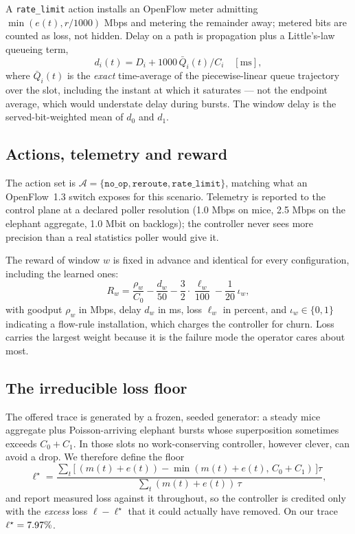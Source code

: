 \documentclass[conference]{IEEEtran}
\begin{document}
A \texttt{rate\_limit} action installs an OpenFlow meter admitting
$\min(e(t), r/1000)$ Mbps and metering the remainder away; metered bits are counted
as loss, not hidden. Delay on a path is propagation plus a Little's-law queueing
term,
\begin{equation}
d_i(t) = D_i + 1000\,\bar{Q}_i(t)/C_i \quad [\text{ms}],
\label{eq:delay}
\end{equation}
where $\bar{Q}_i(t)$ is the \emph{exact} time-average of the piecewise-linear queue
trajectory over the slot, including the instant at which it saturates --- not the
endpoint average, which would understate delay during bursts. The window delay is
the served-bit-weighted mean of $d_0$ and $d_1$.

\subsection{Actions, telemetry and reward}
The action set is $\mathcal{A}=\{\texttt{no\_op},\texttt{reroute},
\texttt{rate\_limit}\}$, matching what an OpenFlow~1.3 switch exposes for this
scenario. Telemetry is reported to the control plane at a declared poller
resolution (1.0 Mbps on mice, 2.5 Mbps on the elephant aggregate, 1.0 Mbit on
backlogs); the controller never sees more precision than a real statistics poller
would give it.

The reward of window $w$ is fixed in advance and identical for every
configuration, including the learned ones:
\begin{equation}
R_w = \frac{\rho_w}{C_0} - \frac{d_w}{50} - \frac{3}{2}\cdot\frac{\ell_w}{100}
      - \frac{1}{20}\,\iota_w ,
\label{eq:reward}
\end{equation}
with goodput $\rho_w$ in Mbps, delay $d_w$ in ms, loss $\ell_w$ in percent, and
$\iota_w\in\{0,1\}$ indicating a flow-rule installation, which charges the
controller for churn. Loss carries the largest weight because it is the failure
mode the operator cares about most.

\subsection{The irreducible loss floor}
The offered trace is generated by a frozen, seeded generator: a steady mice
aggregate plus Poisson-arriving elephant bursts whose superposition sometimes
exceeds $C_0+C_1$. In those slots no work-conserving controller, however clever,
can avoid a drop. We therefore define the floor
\begin{equation}
\ell^{\star} = \frac{\sum_t \big[\,(m(t)+e(t)) - \min(m(t)+e(t),\,C_0+C_1)\,\big]\tau}
                    {\sum_t (m(t)+e(t))\,\tau},
\label{eq:floor}
\end{equation}
and report measured loss against it throughout, so the controller is credited only
with the \emph{excess} loss $\ell-\ell^{\star}$ that it could actually have removed.
On our trace $\ell^{\star}=7.97\%$.
\end{document}
